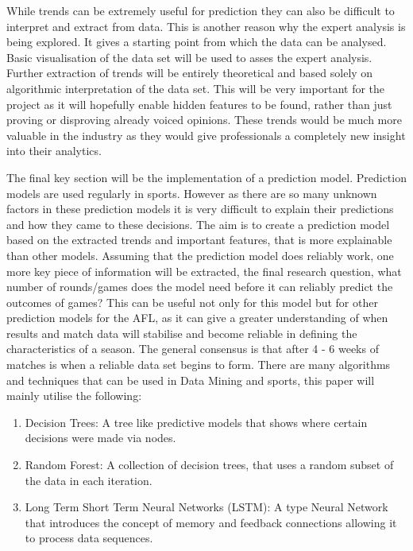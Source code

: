 \documentclass{imc-inf}
\begin{document}
	While trends can be extremely useful for prediction they can also be difficult to interpret and extract from data. This is another reason why the expert analysis is being explored. It gives a starting point from which the data can be analysed. Basic visualisation of the data set will be used to asses the expert analysis. Further extraction of trends will be entirely theoretical and based solely on algorithmic interpretation of the data set. This will be very important for the project as it will hopefully enable hidden features to be found, rather than just proving or disproving already voiced opinions. These trends would be much more valuable in the industry as they would give professionals a completely new insight into their analytics.
	
	The final key section will be the implementation of a prediction model. Prediction models are used regularly in sports. However as there are so many unknown factors in these prediction models it is very difficult to explain their predictions and how they came to these decisions. The aim is to create a prediction model based on the extracted trends and important features, that is more explainable than other models. 
	Assuming that the prediction model does reliably work, one more key piece of information will be extracted, the final research question, what number of rounds/games does the model need before it can reliably predict the outcomes of games? This can be useful not only for this model but for other prediction models for the AFL, as it can give a greater understanding of when results and match data will stabilise and become reliable in defining the characteristics of a season. The general consensus is that after 4 - 6 weeks of matches is when a reliable data set begins to form.
	There are many algorithms and techniques that can be used in Data Mining and sports, this paper will mainly utilise the following:
	
	\begin{enumerate}
		\item[] Decision Trees: A tree like predictive models that shows where certain decisions were made via nodes.
		\item[] Random Forest: A collection of decision trees, that uses a random subset of the data in each iteration.
		\item[] Long Term Short Term Neural Networks (LSTM): A type Neural Network that introduces the concept of memory and feedback connections allowing it to process data sequences.
	\end{enumerate}
	
\end{document}
